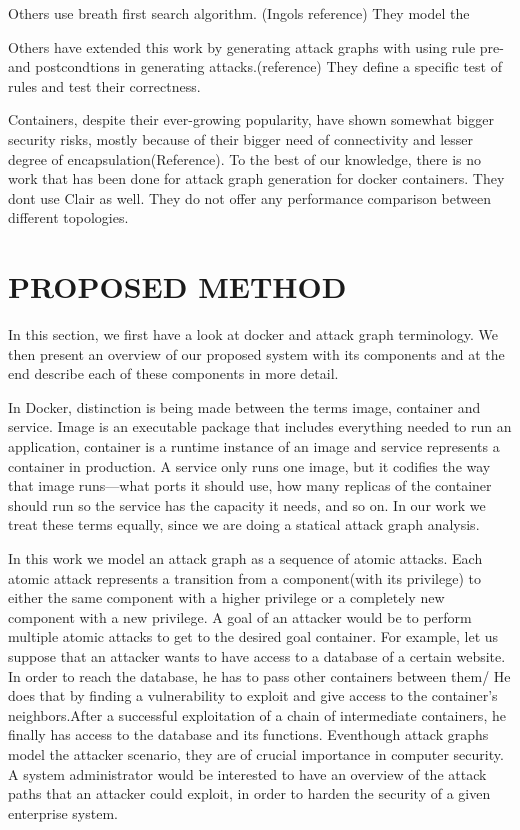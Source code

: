 \documentclass[letterpaper, 10 pt, conference]{ieeeconf}  %
\begin{document}
Others use breath first search algorithm. (Ingols reference)  They model the 

Others have extended this work by generating attack graphs with using rule pre- and postcondtions in generating attacks.(reference) They define a specific test of rules and test their correctness.

Containers, despite their ever-growing popularity, have shown somewhat bigger security risks, mostly because of their bigger need of connectivity and lesser degree of encapsulation(Reference). To the best of our knowledge, there is no work that has been done for attack graph generation for docker containers.
 They dont use Clair as well. They do not offer any performance comparison between different topologies. 

\section{PROPOSED METHOD}


In this section, we first have a look at docker and attack graph terminology. We then present an overview of our proposed system with its components and at the end describe each of these components in more detail. 

In Docker, distinction is being made between the terms image, container and service. Image is an executable package that includes everything needed to run an application,  container is a runtime instance of an image and service represents a container in production. A service only runs one image, but it codifies the way that image runs—what ports it should use, how many replicas of the container should run so the service has the capacity it needs, and so on. In our work we treat these terms equally, since we are doing a statical attack graph analysis.

In this work we model an attack graph as a sequence of atomic attacks. Each atomic attack represents a transition from a component(with its privilege) to either the same component with a higher privilege or a completely new component with a new privilege. A goal of an attacker would be to perform multiple atomic attacks to get to the desired goal container. For example, let us suppose that an attacker wants to have access to a database of a certain website. In order to reach the database, he has to pass other containers between them/ He does that by finding a vulnerability to exploit and give access to the container's neighbors.After a successful exploitation of a chain of intermediate containers, he finally has access to the database and its functions. Eventhough attack graphs model the attacker scenario, they are of crucial importance in computer security. A system administrator would be interested to have an overview of the attack paths that an attacker could exploit, in order to harden the security of a given enterprise system.
\end{document}
